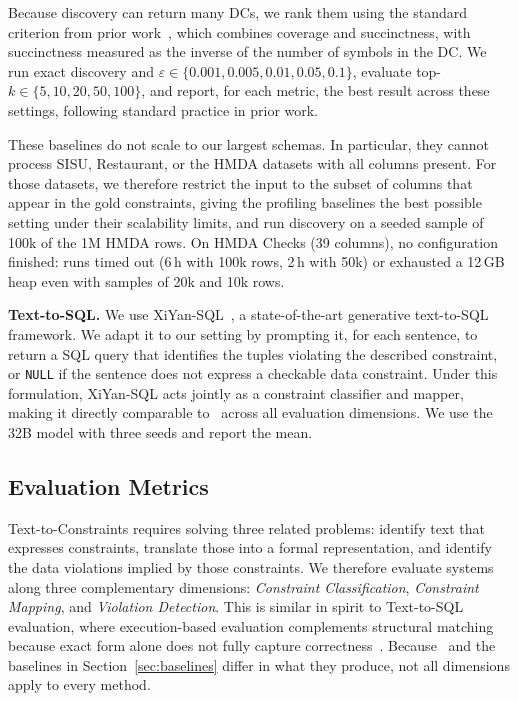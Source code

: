 Because discovery can return many DCs, we rank them using the standard
criterion from prior work~\cite{chu2013discovering}, which combines coverage
and succinctness, with succinctness measured as the inverse of the number of
symbols in the DC. We run exact discovery and $\varepsilon \in \{0.001, 0.005, 0.01, 0.05, 0.1\}$, evaluate top-$k \in \{5, 10, 20, 50, 100\}$, and report, for each metric, the best result across these settings, following standard practice in prior work.

These baselines do not scale to our largest schemas. In particular, they
cannot process SISU, Restaurant, or the HMDA datasets with all columns present.
For those datasets, we therefore restrict the input to the subset of columns that appear
in the gold constraints, giving the profiling baselines the best possible
setting under their scalability limits, and run discovery on a seeded sample of
100k of the 1M HMDA rows. On HMDA Checks (39 columns), no configuration finished:
runs timed out (6\,h with 100k rows, 2\,h with 50k) or exhausted a 12\,GB heap
even with samples of 20k and 10k rows.


\smallskip\noindent\textbf{Text-to-SQL.}
We use XiYan-SQL~\cite{XiYanSQL}, a state-of-the-art generative text-to-SQL
framework. We adapt it to our setting by prompting it, for each sentence, to
return a SQL query that identifies the tuples violating the described
constraint, or \texttt{NULL} if the sentence does not express a checkable data
constraint. Under this formulation, XiYan-SQL acts jointly as a constraint
classifier and mapper, making it directly comparable to \system\ across all
evaluation dimensions. We use the 32B model with three seeds and report the mean.


\subsection{Evaluation Metrics}
\label{sec:metrics}

Text-to-Constraints requires solving three related problems: identify
text that expresses constraints, translate those into a formal
representation, and identify the data violations implied by those constraints.
We therefore evaluate systems along three complementary dimensions:
\textit{Constraint Classification}, \textit{Constraint Mapping}, and
\textit{Violation Detection}. This is similar in spirit to Text-to-SQL evaluation, where
execution-based evaluation complements structural matching because exact form
alone does not fully capture correctness~\cite{zhong-etal-2020-semantic}. Because \system\ and the
baselines in Section~\ref{sec:baselines} differ in what they produce, not all
dimensions apply to every method.

